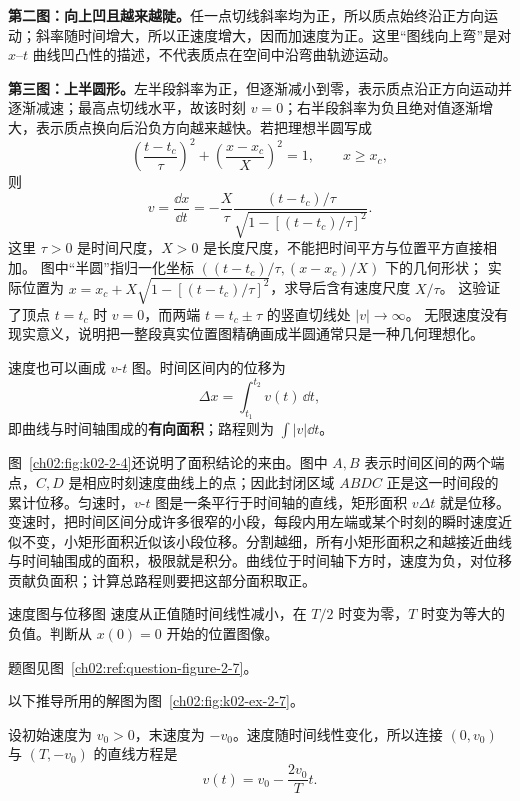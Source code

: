 {\begin{xesolution}
\textbf{第二图：向上凹且越来越陡。}任一点切线斜率均为正，所以质点始终沿正方向运动；斜率随时间增大，所以正速度增大，因而加速度为正。这里“图线向上弯”是对 $x$--$t$ 曲线凹凸性的描述，不代表质点在空间中沿弯曲轨迹运动。

\textbf{第三图：上半圆形。}左半段斜率为正，但逐渐减小到零，表示质点沿正方向运动并逐渐减速；最高点切线水平，故该时刻 $v=0$；右半段斜率为负且绝对值逐渐增大，表示质点换向后沿负方向越来越快。若把理想半圆写成
\[
 \left(\frac{t-t_c}{\tau}\right)^2+
 \left(\frac{x-x_c}{X}\right)^2=1,\qquad x\ge x_c,
\]
则
\[
 v=\frac{\dd x}{\dd t}
   =-\frac X\tau\frac{(t-t_c)/\tau}{\sqrt{1-[(t-t_c)/\tau]^2}}.
\]
这里 $\tau>0$ 是时间尺度，$X>0$ 是长度尺度，不能把时间平方与位置平方直接相加。
图中“半圆”指归一化坐标 $((t-t_c)/\tau,(x-x_c)/X)$ 下的几何形状；
实际位置为 $x=x_c+X\sqrt{1-[(t-t_c)/\tau]^2}$，求导后含有速度尺度 $X/\tau$。
这验证了顶点 $t=t_c$ 时 $v=0$，而两端 $t=t_c\pm\tau$ 的竖直切线处 $|v|\to\infty$。
无限速度没有现实意义，说明把一整段真实位置图精确画成半圆通常只是一种几何理想化。
\end{xesolution}

速度也可以画成 $v$-$t$ 图。时间区间内的位移为
\begin{equation}
  \Delta x=\int_{t_1}^{t_2}v(t)\,\dd t,
\end{equation}
即曲线与时间轴围成的\textbf{有向面积}；路程则为 $\int|v|\dd t$。

图~\ref{ch02:fig:k02-2-4}还说明了面积结论的来由。图中 $A,B$ 表示时间区间的两个端点，$C,D$ 是相应时刻速度曲线上的点；因此封闭区域 $ABDC$ 正是这一时间段的累计位移。匀速时，$v$-$t$ 图是一条平行于时间轴的直线，矩形面积 $v\Delta t$ 就是位移。变速时，把时间区间分成许多很窄的小段，每段内用左端或某个时刻的瞬时速度近似不变，小矩形面积近似该小段位移。分割越细，所有小矩形面积之和越接近曲线与时间轴围成的面积，极限就是积分。曲线位于时间轴下方时，速度为负，对位移贡献负面积；计算总路程则要把这部分面积取正。

\VelocityAreaDiagram

\begin{origexamplebox}{速度图与位移图}\label{ch02:ex:k02-2-7}
速度从正值随时间线性减小，在 $T/2$ 时变为零，$T$ 时变为等大的负值。判断从 $x(0)=0$ 开始的位置图像。
\par 题图见图~\ref{ch02:ref:question-figure-2-7}。
\KQuestionAH
\end{origexamplebox}
\begin{xesolution}
以下推导所用的解图为图~\ref{ch02:fig:k02-ex-2-7}。

设初始速度为 $v_0>0$，末速度为 $-v_0$。速度随时间线性变化，所以连接 $(0,v_0)$ 与 $(T,-v_0)$ 的直线方程是
\[
 v(t)=v_0-\frac{2v_0}{T}t.
\]
\ExampleTwoSevenGraphs


\end{xesolution}}
